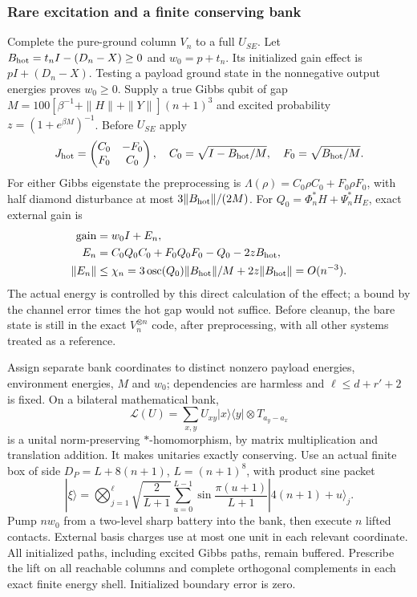 \subsubsection{Rare excitation and a finite conserving bank}
Complete the pure-ground column $V_n$ to a full $U_{SE}$.
Let $B_{\rm hot}=t_nI-(D_n-X)\ge0$ and $w_0=p+t_n$.
Its initialized gain effect is $pI+(D_n-X)$. Testing a payload
ground state in the nonnegative output energies proves $w_0\ge0$.
Supply a true Gibbs qubit of gap
$M=100[\beta^{-1}+\|H\|+\|Y\|](n+1)^3$ and excited probability
$z=(1+e^{\beta M})^{-1}$. Before $U_{SE}$ apply
\[
 J_{\rm hot}=\begin{pmatrix}C_0&-F_0\\F_0&C_0\end{pmatrix},
 \quad C_0=\sqrt{I-B_{\rm hot}/M},\quad F_0=\sqrt{B_{\rm hot}/M}.
\]
For either Gibbs eigenstate the preprocessing is
$\Lambda(\rho)=C_0\rho C_0+F_0\rho F_0$, with half diamond disturbance
at most $3\|B_{\rm hot}\|/(2M)$.
For $Q_0=\Phi_n^*H+\Psi_n^*H_E$, exact external gain is
\[
 \begin{aligned}
 \text{gain}&=w_0I+E_n,\\
 E_n&=C_0Q_0C_0+F_0Q_0F_0-Q_0-2zB_{\rm hot},\\
 \|E_n\|&\le\chi_n
 =3\operatorname{osc}(Q_0)\|B_{\rm hot}\|/M+2z\|B_{\rm hot}\|=O(n^{-3}).
 \end{aligned}
\]
The actual energy is controlled by this direct calculation of the effect;
a bound by the channel error times the hot gap would not suffice. Before cleanup, the bare state is still in
the exact $V_n^{\otimes n}$ code, after preprocessing, with all
other systems treated as a reference.

Assign separate bank coordinates to distinct nonzero payload energies,
environment energies, $M$ and $w_0$; dependencies are harmless and
$\ell\le d+r'+2$ is fixed. On a bilateral mathematical bank,
\[
 \mathcal L(U)=\sum_{x,y}U_{xy}|x\rangle\langle y|
                         \otimes T_{a_y-a_x}
\]
is a unital norm-preserving $*$-homomorphism, by matrix multiplication
and translation addition. It makes unitaries exactly conserving.
Use an actual finite box of side $D_P=L+8(n+1)$, $L=(n+1)^8$,
with product sine packet
\[
 |\xi\rangle=\bigotimes_{j=1}^{\ell}
 \sqrt{\frac2{L+1}}\sum_{u=0}^{L-1}
 \sin\frac{\pi(u+1)}{L+1}|4(n+1)+u\rangle_j .
\]
Pump $nw_0$ from a two-level sharp battery into the bank, then execute
$n$ lifted contacts. External basis charges use at most one unit in
each relevant coordinate. All initialized paths, including excited
Gibbs paths, remain buffered. Prescribe the lift on all reachable
columns and complete orthogonal complements in each exact finite
energy shell. Initialized boundary error is zero.

